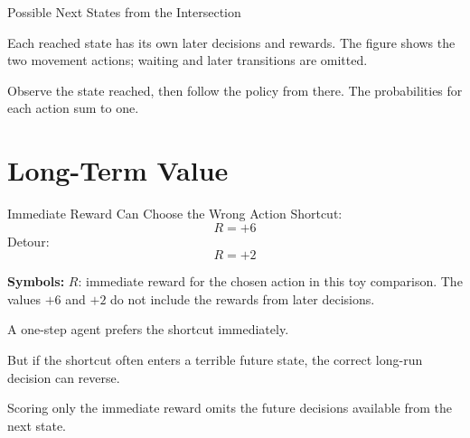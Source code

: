 \documentclass[aspectratio=169,10pt]{beamer}
\newcommand{\equationlegend}[1]{%
  \par\smallskip
  \begingroup
    \setlength{\fboxsep}{4pt}%
    \noindent\colorbox{DeckSoft}{%
      \parbox{\dimexpr\linewidth-2\fboxsep\relax}{%
        \footnotesize\textbf{Symbols:} #1%
      }%
    }\par
  \endgroup
  \smallskip
}
\begin{document}
\begin{frame}{Possible Next States from the Intersection}
  \small
  \begin{center}
  \end{center}
  Each reached state has its own later decisions and rewards. The figure shows the two movement actions; waiting and later transitions are omitted.
  \begin{keyidea}
    Observe the state reached, then follow the policy from there. The probabilities for each action sum to one.
  \end{keyidea}
\end{frame}

\section{Long-Term Value}

\begin{frame}[shrink=10]{Immediate Reward Can Choose the Wrong Action}
  Shortcut:
  \[
    R=+6
  \]
  Detour:
  \[
    R=+2
  \]
  \equationlegend{$R$: immediate reward for the chosen action in this toy comparison. The values $+6$ and $+2$ do not include the rewards from later decisions.}

  A one-step agent prefers the shortcut immediately.

  But if the shortcut often enters a terrible future state, the correct long-run decision can reverse.

  \begin{keyidea}
    Scoring only the immediate reward omits the future decisions available from the next state.
  \end{keyidea}
\end{frame}
\end{document}
